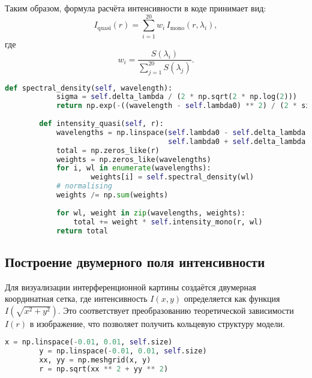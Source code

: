 \documentclass[a4paper,11pt]{article}
\theoremstyle{definition}
\begin{document}
\begin{itemize}
        Таким образом, формула расчёта интенсивности в коде принимает вид:
        \[
        I_{\text{quasi}}(r) = \sum_{i=1}^{20} w_i \, I_{\text{mono}}(r, \lambda_i),
        \]
        где
        \[
        w_i = \frac{S(\lambda_i)}{\sum_{j=1}^{20} S(\lambda_j)}.
        \]

        \begin{lstlisting}[language=Python]
        def spectral_density(self, wavelength):
            sigma = self.delta_lambda / (2 * np.sqrt(2 * np.log(2)))
            return np.exp(-((wavelength - self.lambda0) ** 2) / (2 * sigma ** 2))
        
        def intensity_quasi(self, r):
            wavelengths = np.linspace(self.lambda0 - self.delta_lambda / 2,
                                      self.lambda0 + self.delta_lambda / 2, 20)
            total = np.zeros_like(r)
            weights = np.zeros_like(wavelengths)
            for i, wl in enumerate(wavelengths):
                    weights[i] = self.spectral_density(wl)
            # normalising
            weights /= np.sum(weights)
        
            for wl, weight in zip(wavelengths, weights):
                total += weight * self.intensity_mono(r, wl)
            return total
        \end{lstlisting}

    \end{itemize}


    \subsection{Построение двумерного поля интенсивности}
    Для визуализации интерференционной картины создаётся двумерная координатная сетка, где интенсивность \( I(x,y) \)
    определяется как функция \( I\left(\sqrt{x^2+y^2}\right) \). Это соответствует преобразованию теоретической
    зависимости \( I(r) \) в изображение, что позволяет получить кольцевую структуру модели.

    \begin{lstlisting}[language=Python]
        x = np.linspace(-0.01, 0.01, self.size)
        y = np.linspace(-0.01, 0.01, self.size)
        xx, yy = np.meshgrid(x, y)
        r = np.sqrt(xx ** 2 + yy ** 2)
    \end{lstlisting}
\end{document}

